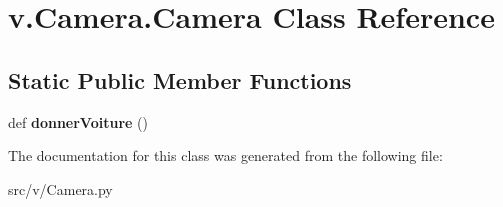 \hypertarget{classv_1_1_camera_1_1_camera}{}\section{v.\+Camera.\+Camera Class Reference}
\label{classv_1_1_camera_1_1_camera}
\subsection*{Static Public Member Functions}
\begin{DoxyCompactItemize}
\item 
\hypertarget{classv_1_1_camera_1_1_camera_a3fefc3f3d164b0ad15c03399af1318a7}{}def {\bfseries donner\+Voiture} ()\label{classv_1_1_camera_1_1_camera_a3fefc3f3d164b0ad15c03399af1318a7}

\end{DoxyCompactItemize}


The documentation for this class was generated from the following file\+:\begin{DoxyCompactItemize}
\item 
src/v/Camera.\+py\end{DoxyCompactItemize}
